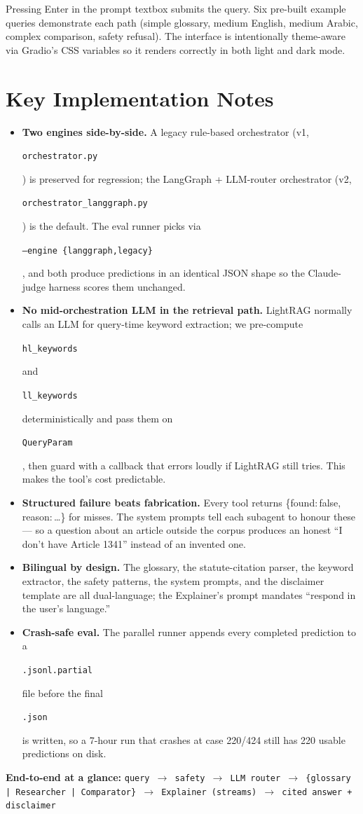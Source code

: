 \documentclass[10pt,a4paper]{article}
\newcommand{\code}[1]{\colorbox{boxbg}{\strut\texttt{\small #1}}}
\begin{document}
\noindent Pressing Enter in the prompt textbox submits the query. Six pre-built example queries demonstrate each path (simple glossary, medium English, medium Arabic, complex comparison, safety refusal). The interface is intentionally theme-aware via Gradio's CSS variables so it renders correctly in both light and dark mode.

\section{Key Implementation Notes}

\begin{itemize}
\item \textbf{Two engines side-by-side.} A legacy rule-based orchestrator (v1, \code{orchestrator.py}) is preserved for regression; the LangGraph + LLM-router orchestrator (v2, \code{orchestrator\_langgraph.py}) is the default. The eval runner picks via \code{--engine \{langgraph,legacy\}}, and both produce predictions in an identical JSON shape so the Claude-judge harness scores them unchanged.
\item \textbf{No mid-orchestration LLM in the retrieval path.} LightRAG normally calls an LLM for query-time keyword extraction; we pre-compute \code{hl\_keywords} and \code{ll\_keywords} deterministically and pass them on \code{QueryParam}, then guard with a callback that errors loudly if LightRAG still tries. This makes the tool's cost predictable.
\item \textbf{Structured failure beats fabrication.} Every tool returns \{found:\,false, reason:\,…\} for misses. The system prompts tell each subagent to honour these — so a question about an article outside the corpus produces an honest ``I don't have Article 1341'' instead of an invented one.
\item \textbf{Bilingual by design.} The glossary, the statute-citation parser, the keyword extractor, the safety patterns, the system prompts, and the disclaimer template are all dual-language; the Explainer's prompt mandates ``respond in the user's language.''
\item \textbf{Crash-safe eval.} The parallel runner appends every completed prediction to a \code{.jsonl.partial} file before the final \code{.json} is written, so a 7-hour run that crashes at case 220/424 still has 220 usable predictions on disk.
\end{itemize}

\smallskip
\noindent\colorbox{boxbg}{\parbox{0.96\linewidth}{\textbf{End-to-end at a glance:} \texttt{query \(\rightarrow\) safety \(\rightarrow\) LLM router \(\rightarrow\) \{glossary | Researcher | Comparator\} \(\rightarrow\) Explainer (streams) \(\rightarrow\) cited answer + disclaimer}}}
\end{document}
